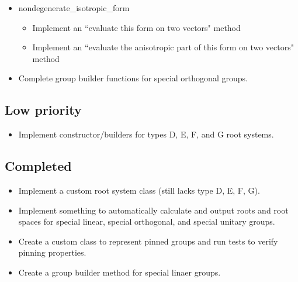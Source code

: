 \documentclass[12pt]{article}
\begin{document}
\begin{itemize}
	\item nondegenerate\_isotropic\_form
	\begin{itemize}
		\item Implement an ``evaluate this form on two vectors" method
		\item Implement an ``evaluate the anisotropic part of this form on two vectors" method
	\end{itemize}

	\item Complete group builder functions for special orthogonal groups.
\end{itemize}

\subsection{Low priority}
\begin{itemize}
	\item Implement constructor/builders for types D, E, F, and G root systems.
\end{itemize}

\subsection{Completed}
\begin{itemize}
	\item Implement a custom root system class (still lacks type D, E, F, G).
	\item Implement something to automatically calculate and output roots and root spaces for special linear, special orthogonal, and special unitary groups.
	\item Create a custom class to represent pinned groups and run tests to verify pinning properties.
	\item Create a group builder method for special linaer groups.
\end{itemize}
\end{document}

